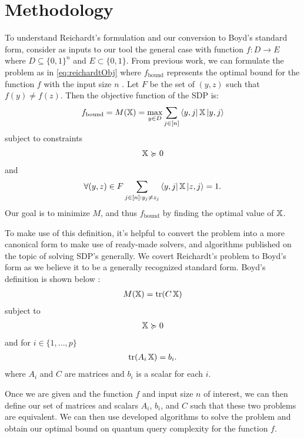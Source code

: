 \section{Methodology}\label{sec:method}
To understand Reichardt's formulation and our conversion
to Boyd's standard form, consider as inputs to our tool
the general case with function $f: D \rightarrow E$ where
$D \subseteq {\{0,1\}}^n$ and $E \subset {\{0,1\}}$. From
previous work, we can formulate the problem as in
\cref{eq:reichardtObj} where $f_{\text{bound}}$ represents
the optimal bound for the function $f$ with the input size
$n$ \cite{reichardt2009span}. Let $F$ be the set of $(y,z)$ such that $f(y) \neq f(z)$.
Then the objective function of the SDP is:
\begin{align} \label{eq:reichardtObj} 
    f_{\text{bound}} = M(\operatorname{\mathbb{X}}) = \max_{y \in D} \sum_{j \in [n]}
    \bra{y,j}\operatorname{\mathbb{X}}\ket{y,j} 
\end{align}
subject to constraints
\begin{align}\label{Eq:reichardtSemi}
    \operatorname{\mathbb{X}} \succcurlyeq 0 
\end{align}
and
\begin{align}\label{Eq:reichardtOffDiag}
    \forall (y,z) \in F \sum_{j \in [n]: y_j \ne z_j} 
    \bra{y,j} \operatorname{\mathbb{X}} \ket{z, j} = 1.
\end{align}
Our goal is to minimize $M$, and thus $f_{\text{bound}}$ by finding the optimal value of $\operatorname{\mathbb{X}}$.

To make use of this definition, it's helpful to convert
the problem into a more canonical form to make use of
ready-made solvers, and algorithms published on the
topic of solving SDP's generally. We covert Reichardt's problem to Boyd's form as we believe it to be a generally recognized standard form. Boyd's definition is shown below \cite{boyd2004convex}:
\begin{align}\label{Eq:boyd_obj}
    M(\operatorname{\mathbb{X}}) = \operatorname{\text{tr}}(C\operatorname{\mathbb{X}}) 
\end{align}
subject to
\begin{align} \label{Eq:boydSemi}
    \operatorname{\mathbb{X}} \succcurlyeq 0   
\end{align}
and for $i \in \{1,...,p\}$
\begin{align} \label{Eq:boydTraceCon}
    \operatorname{\text{tr}}(A_i \operatorname{\mathbb{X}}) = b_i. 
\end{align}
where $A_i$ and $C$ are matrices and $b_i$ is a scalar for each $i$.

Once we are given and the function $f$ and input size
$n$ of interest, we can then define our set of matrices
and scalars $A_i$, $b_i$, and $C$ such that these two
problems are equivalent. We can then use developed algorithms to solve the problem and obtain our optimal bound on quantum query complexity for the function $f$.

